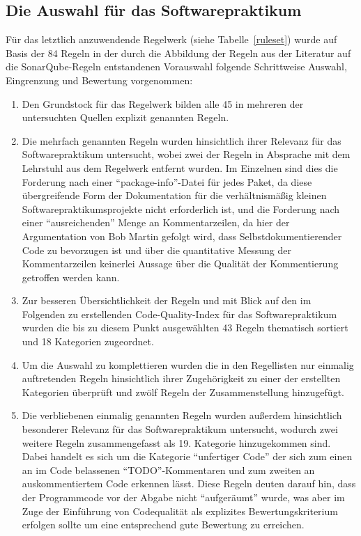\documentclass[da,ngerman]{stthesis}
\begin{document}
			\subsection{Die Auswahl für das Softwarepraktikum}
				Für das letztlich anzuwendende Regelwerk (siehe Tabelle~\ref{ruleset}) wurde auf Basis der 84 Regeln in der durch die Abbildung der Regeln aus der Literatur auf die SonarQube-Regeln entstandenen Vorauswahl folgende Schrittweise Auswahl, Eingrenzung und Bewertung vorgenommen:
				\begin{enumerate}
					\item Den Grundstock für das Regelwerk bilden alle 45 in mehreren der untersuchten Quellen explizit genannten Regeln.
					\item Die mehrfach genannten Regeln wurden hinsichtlich ihrer Relevanz für das Softwarepraktikum untersucht, wobei zwei der Regeln in Absprache mit dem Lehrstuhl aus dem Regelwerk entfernt wurden. Im Einzelnen sind dies die Forderung nach einer "`package-info"'-Datei für jedes Paket, da diese übergreifende Form der Dokumentation für die verhältnismäßig kleinen Softwarepraktikumsprojekte nicht erforderlich ist, und die Forderung nach einer "`ausreichenden"' Menge an Kommentarzeilen, da hier der Argumentation von Bob Martin \cite{CleanCode} gefolgt wird, dass Selbstdokumentierender Code zu bevorzugen ist und über die quantitative Messung der Kommentarzeilen keinerlei Aussage über die Qualität der Kommentierung getroffen werden kann.
					\item Zur besseren Übersichtlichkeit der Regeln und mit Blick auf den im Folgenden zu erstellenden Code-Quality-Index für das Softwarepraktikum wurden die bis zu diesem Punkt ausgewählten 43 Regeln thematisch sortiert und 18 Kategorien zugeordnet.
					\item Um die Auswahl zu komplettieren wurden die in den Regellisten nur einmalig auftretenden Regeln hinsichtlich ihrer Zugehörigkeit zu einer der erstellten Kategorien überprüft und zwölf Regeln der Zusammenstellung hinzugefügt.
					\item Die verbliebenen einmalig genannten Regeln wurden außerdem hinsichtlich besonderer Relevanz für das Softwarepraktikum untersucht, wodurch zwei weitere Regeln zusammengefasst als 19. Kategorie hinzugekommen sind. Dabei handelt es sich um die Kategorie "`unfertiger Code"' der sich zum einen an im Code belassenen "`TODO"'-Kommentaren und zum zweiten an auskommentiertem Code erkennen lässt. Diese Regeln deuten darauf hin, dass der Programmcode vor der Abgabe nicht "`aufgeräumt"' wurde, was aber im Zuge der Einführung von Codequalität als explizites Bewertungskriterium erfolgen sollte um eine entsprechend gute Bewertung zu erreichen.

\end{enumerate}
\end{document}
